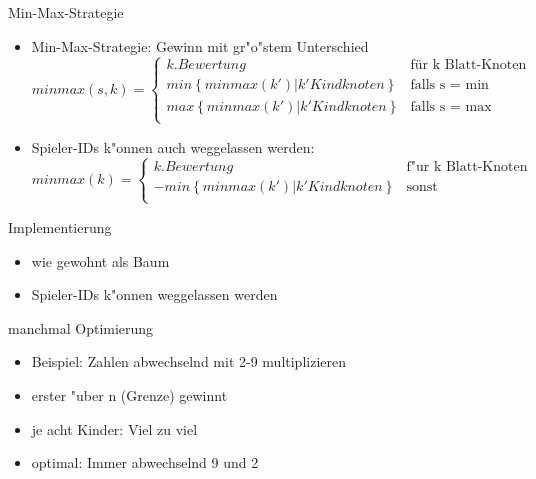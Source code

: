 \documentclass[18pt]{beamer}
\begin{document}
\begin{frame}{Min-Max-Strategie}
\begin{itemize}
\item Min-Max-Strategie: Gewinn mit gr"o"stem Unterschied
\begin{equation}
   minmax(s,k) =
   \begin{cases}
     k.Bewertung & \text{für k Blatt-Knoten} \\
     min\left\{minmax(k') | k' Kindknoten\right\} & \text{falls s = min} \\
     max\left\{minmax(k') | k' Kindknoten\right\} & \text{falls s = max} \\
   \end{cases}
\end{equation}
\pause
\item Spieler-IDs k"onnen auch weggelassen werden: 
\begin{equation}
   minmax(k) =
   \begin{cases}
     k.Bewertung & \text{f"ur k Blatt-Knoten} \\
     - min\left\{minmax(k') | k' Kindknoten\right\} & \text{sonst} \\
   \end{cases}
\end{equation}
\end{itemize}
\end{frame}

\begin{frame}{Implementierung}
\begin{itemize}
\item wie gewohnt als Baum

\pause
\item Spieler-IDs k"onnen weggelassen werden

\end{itemize}
\end{frame}

\begin{frame}{manchmal Optimierung}
\begin{itemize}
\item Beispiel: Zahlen abwechselnd mit 2-9 multiplizieren
\pause
\item erster "uber n (Grenze) gewinnt
\pause
\item je acht Kinder: Viel zu viel
\pause
\item optimal: Immer abwechselnd 9 und 2
\end{itemize}
\end{frame}
\end{document}
